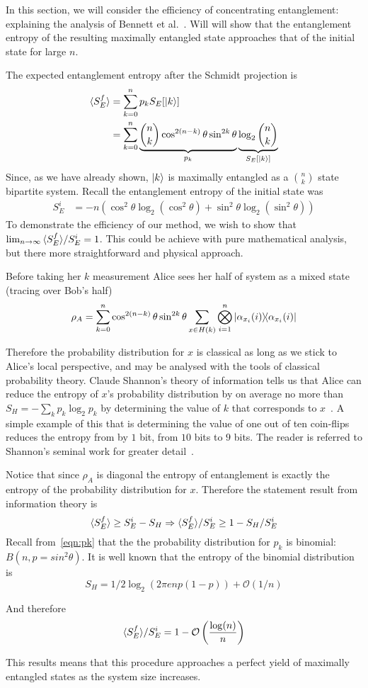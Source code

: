 In this section, we will consider the efficiency of concentrating entanglement: explaining the analysis of Bennett et al.~\cite{bennett1996concentrating}.
Will will show that the entanglement entropy of the resulting maximally entangled state approaches that of the initial state for large $n$.

The expected entanglement entropy after the Schmidt projection is
\begin{align*}
{\langle S_E^f \rangle} &= \sum_{k=0}^n p_k S_E[\ket{k}] \\
&=\sum_{k=0}^n \underbrace{\binom{n}{k} \cos^{2(n-k)}\theta \sin^{2k}\theta}_{p_k}
 \underbrace{\log_2 \binom{n}{k}}_{S_E[\ket{k}]}
\end{align*}
Since, as we have already shown, $\ket{k}$ is maximally entangled as a $\binom{n}{k}$ state bipartite system.
Recall the entanglement entropy of the initial state was
\begin{align*}
S_{E}^i &= -n \left( \cos^2\theta \log_2 \left(\cos^2\theta \right)
+ \sin^2\theta \log_2 \left(\sin^2\theta \right)\right)
\end{align*}
To demonstrate the efficiency of our method, we wish to show that \\$\lim_{n \rightarrow \infty}  {\langle S_E^f \rangle} / S_E^i  = 1$.
This could be achieve with pure mathematical analysis, but there more straightforward and physical approach.

Before taking her $k$ measurement Alice sees her half of system as a mixed state (tracing over Bob's half)
\begin{align*}
\rho_A = \sum_{k=0}^n \cos^{2(n-k)}\theta \sin^{2k}\theta
\sum_{x \in H(k)} \bigotimes_{i=1}^n 
\dyad{\alpha_{x_i}(i)}{\alpha_{x_i}(i)}
\end{align*}

Therefore the probability distribution for $x$ is classical as long as we stick to Alice's local perspective, and may be analysed with the tools of classical probability theory.
Claude Shannon's theory of information tells us that Alice can reduce the entropy of $x$'s probability distribution  by on average no more than $S_H = - \sum_k p_k \log_2 p_k$ by determining the value of $k$ that corresponds to $x$~\cite{shannon2001communication}. A simple example of this that is determining the value of one out of ten coin-flips reduces the entropy from by $1$ bit, from $10$ bits to $9$ bits. The reader is referred to Shannon's seminal work for greater detail~\cite{shannon2001communication}.

Notice that since $\rho_A$ is diagonal the entropy of entanglement is exactly the entropy of the probability distribution for $x$.
Therefore the statement result from information theory is
$$
{\langle S_E^f \rangle} \ge S_E^i - S_H \Rightarrow {\langle S_E^f \rangle} / S_E^i \ge 1 - S_H /S_E^i 
$$
Recall from~\eqref{eqn:pk} that the the probability distribution for $p_k$ is binomial: $B(n, p=sin^2\theta)$.
It is well known that the entropy of the binomial distribution is
$$S_H = 1/2 \log_2 \left(2 \pi e n p (1-p)\right) + \mathcal{O}(1/n)$$

And therefore 
$$
{\langle S_E^f \rangle} / S_E^i = 1 - \mathcal{O}\left(\frac{\log(n)}{n}\right)
$$

This results means that this procedure approaches a perfect yield of maximally entangled states as the system size increases.